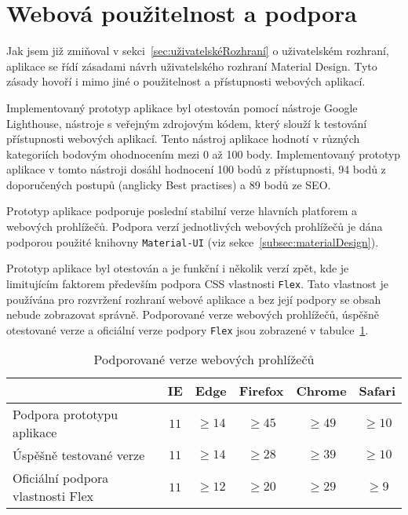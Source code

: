 
\section{Webová použitelnost a podpora}\label{sec:webováPoužitelnostAPodpora}

Jak jsem již zmiňoval v sekci~\ref{sec:uživatelskéRozhraní} o uživatelském rozhraní, aplikace se řídí zásadami návrh uživatelského rozhraní Material Design.
Tyto zásady hovoří i mimo jiné o použitelnost a přístupnosti webových aplikací.

Implementovaný prototyp aplikace byl otestován pomocí nástroje Google Lighthouse, nástroje s veřejným zdrojovým kódem, který slouží k testování přístupnosti webových aplikací.
Tento nástroj aplikace hodnotí v různých kategoriích bodovým ohodnocením mezi 0 až 100 body.
Implementovaný prototyp aplikace v tomto nástroji dosáhl hodnocení 100 bodů z přístupnosti, 94 bodů z doporučených postupů (anglicky Best practises) a 89 bodů ze \gls{SEO}.

Prototyp aplikace podporuje poslední stabilní verze hlavních platforem a webových prohlížečů.
Podpora verzí jednotlivých webových prohlížečů je dána podporou použité knihovny \texttt{Material-UI} (viz sekce~\ref{subsec:materialDesign}).

Prototyp aplikace byl otestován a je funkční i několik verzí zpět, kde je limitujícím faktorem především podpora \acrshort{CSS} vlastnosti \texttt{Flex}.
Tato vlastnost je používána pro rozvržení rozhraní webové aplikace a bez její podpory se obsah nebude zobrazovat správně.
Podporované verze webových prohlížečů, úspěšně otestované verze a oficiální verze podpory \texttt{Flex} jsou zobrazené v tabulce~\ref{tab:verzeProhlížečů}.

\begin{table}[ht!]
    \centering
    \caption{Podporované verze webových prohlížečů}
    \label{tab:verzeProhlížečů}
    \begin{tabular}{l|ccccc}
        & IE & Edge & Firefox & Chrome & Safari \\ \hline
        Podpora prototypu aplikace & $11$ & $\geq 14$ & $\geq 45$ & $\geq 49$ & $\geq 10$ \\
        Úspěšně testované verze & $11$ & $\geq 14$ & $\geq 28$ & $\geq 39$ & $\geq 10$ \\
        Oficiální podpora vlastnosti Flex & $11$ & $\geq 12$ & $\geq 20$ & $\geq 29$ & $\geq 9$
    \end{tabular}
\end{table}
